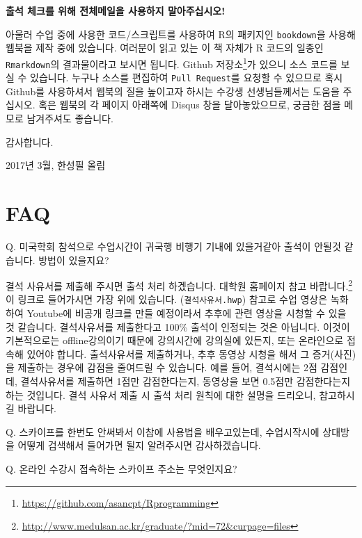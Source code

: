 \documentclass[12pt,]{krantz}
\renewenvironment{quote}{\begin{VF}}{\end{VF}}
\renewcommand{\href}[2]{#2\footnote{\url{#1}}}
\begin{document}
\textbf{출석 체크를 위해 전체메일을 사용하지 말아주십시오!}

아울러 수업 중에 사용한 코드/스크립트를 사용하여 R의 패키지인
\texttt{bookdown}을 사용해 웹북을 제작 중에 있습니다. \citep{R-bookdown}
 여러분이 읽고 있는 이 책 자체가 R 코드의 일종인
\texttt{Rmarkdown}의 결과물이라고 보시면 됩니다.
\href{https://github.com/asancpt/Rprogramming}{Github 저장소}가 있으니
소스 코드를 보실 수 있습니다. 누구나 소스를 편집하여
\texttt{Pull\ Request}를 요청할 수 있으므로 혹시 Github를 사용하셔서
웹북의 질을 높이고자 하시는 수강생 선생님들께서는 도움을 주십시오. 혹은
웹북의 각 페이지 아래쪽에 Disqus 창을 달아놓았으므로, 궁금한 점을 메모로
남겨주셔도 좋습니다. 

감사합니다.

2017년 3월, 한성필 올림

\section*{FAQ}\label{faq}


\begin{quote}
Q. 미국학회 참석으로 수업시간이 귀국행 비행기 기내에 있을거같아 출석이
안될것 같습니다. 방법이 있을지요?
\end{quote}

결석 사유서를 제출해 주시면 출석 처리 하겠습니다.
\href{http://www.medulsan.ac.kr/graduate/?mid=72\&curpage=files}{대학원
홈페이지 참고 바랍니다.} 이 링크로 들어가시면 가장 위에 있습니다.
(\texttt{결석사유서.hwp}) 참고로 수업 영상은 녹화하여 Youtube에 비공개
링크를 만들 예정이라서 추후에 관련 영상을 시청할 수 있을 것 같습니다.
결석사유서를 제출한다고 100\% 출석이 인정되는 것은 아닙니다. 이것이
기본적으로는 offline강의이기 때문에 강의시간에 강의실에 있든지, 또는
온라인으로 접속해 있어야 합니다. 출석사유서를 제출하거나, 추후 동영상
시청을 해서 그 증거(사진)을 제출하는 경우에 감점을 줄여드릴 수 있습니다.
예를 들어, 결석시에는 2점 감점인데, 결석사유서를 제출하면 1점만
감점한다는지, 동영상을 보면 0.5점만 감점한다는지 하는 것입니다. 결석
사유서 제출 시 출석 처리 원칙에 대한 설명을 드리오니, 참고하시길
바랍니다.

\begin{quote}
Q. 스카이프를 한번도 안써봐서 이참에 사용법을 배우고있는데, 수업시작시에
상대방을 어떻게 검색해서 들어가면 될지 알려주시면 감사하겠습니다.
\end{quote}

\begin{quote}
Q. 온라인 수강시 접속하는 스카이프 주소는 무엇인지요?
\end{quote}
\end{document}
